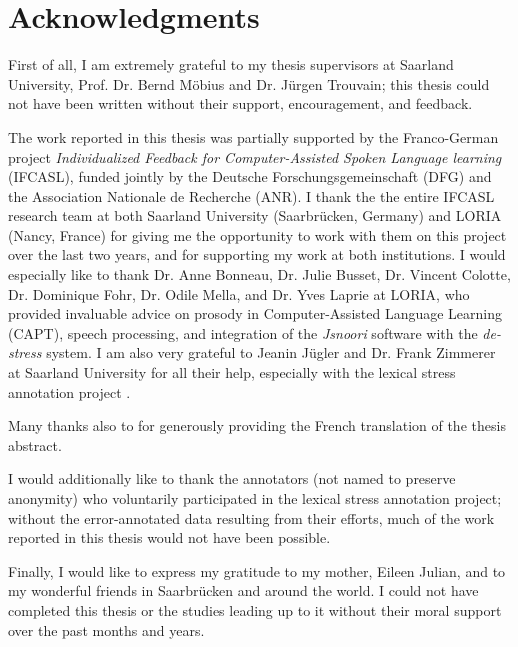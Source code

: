 %
\chapter*{Acknowledgments}
\label{sec:thanks}
\vspace*{-10mm}


First of all, I am extremely grateful to my thesis supervisors at Saarland University, Prof. Dr. Bernd Möbius and Dr. Jürgen Trouvain; this thesis could not have been written without their support, encouragement, and feedback.

The work reported in this thesis was partially supported by the Franco-German project \textit{Individualized Feedback for Computer-Assisted Spoken Language learning} (IFCASL), funded jointly by the Deutsche Forschungsgemeinschaft (DFG) and the Association Nationale de Recherche (ANR). I thank the the entire IFCASL research team at both Saarland University (Saarbrücken, Germany) and LORIA (Nancy, France) for giving me the opportunity to work with them on this project over the last two years, and for supporting my work at both institutions.
%
I would especially like to thank Dr. Anne Bonneau, Dr. Julie Busset, Dr. Vincent Colotte, Dr. Dominique Fohr, Dr. Odile Mella, and Dr. Yves Laprie at LORIA, who provided invaluable advice on prosody in Computer-Assisted Language Learning (CAPT), speech processing, and integration of the \textit{Jsnoori} software with the \textit{de-stress} system. I am also very grateful to Jeanin Jügler and Dr. Frank Zimmerer at Saarland University for all their help, especially with the lexical stress annotation project . 

Many thanks also to  for generously providing the French translation of the thesis abstract.

I would additionally like to thank the annotators (not named to preserve anonymity) who voluntarily participated in the lexical stress annotation project; without the error-annotated data resulting from their efforts, much of the work reported in this thesis would not have been possible.

Finally, I would like to express my gratitude to 
my mother, Eileen Julian, and to my wonderful friends in Saarbrücken and around the world.
I could not have completed this thesis or the studies leading up to it without 
their moral support over the past months and years.